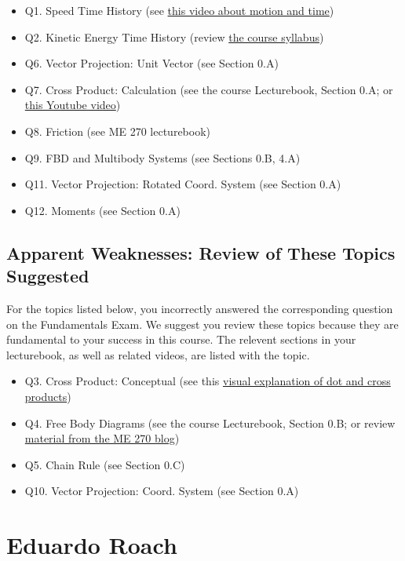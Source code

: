 \documentclass[11pt,letterpaper]{article}\usepackage[]{graphicx}\usepackage[]{color}
\begin{document}
\begin{itemize}\item Q1. Speed Time History (see \href{https://www.youtube.com/watch?v=lZPtFDXYQRU}{this video about motion and time})
\item Q2. Kinetic Energy Time History (review \href{https://www.purdue.edu/freeform/dynamics/wp-content/uploads/sites/4/2018/01/Syllabus-Spring-2018.pdf}{the course syllabus})
\item Q6. Vector Projection: Unit Vector (see Section 0.A)
\item Q7. Cross Product: Calculation (see the course Lecturebook, Section 0.A; or \href{https://www.youtube.com/watch?v=DmPxjmymM7k}{this Youtube video})
\item Q8. Friction (see ME 270 lecturebook)
\item Q9. FBD and Multibody Systems (see Sections 0.B, 4.A)
\item Q11. Vector Projection: Rotated Coord. System (see Section 0.A)
\item Q12. Moments (see Section 0.A)
\end{itemize}\subsection*{Apparent Weaknesses: Review of These Topics Suggested}
For the topics listed below, you incorrectly answered the corresponding question on the Fundamentals Exam.  We suggest you review these topics because they are fundamental to your success in this course.  The relevent sections in your lecturebook, as well as related videos, are listed with the topic.

\begin{itemize}\item Q3. Cross Product: Conceptual (see this \href{https://www.youtube.com/watch?v=h0NJK4mEIJU&t=8s}{visual explanation of dot and cross products})
\item Q4. Free Body Diagrams (see the course Lecturebook, Section 0.B; or review \href{https://www.purdue.edu/statics/}{material from the ME 270 blog})
\item Q5. Chain Rule (see Section 0.C)
\item Q10. Vector Projection: Coord. System (see Section 0.A)
\end{itemize}

\pagebreak
\section*{Eduardo Roach}
\end{document}
